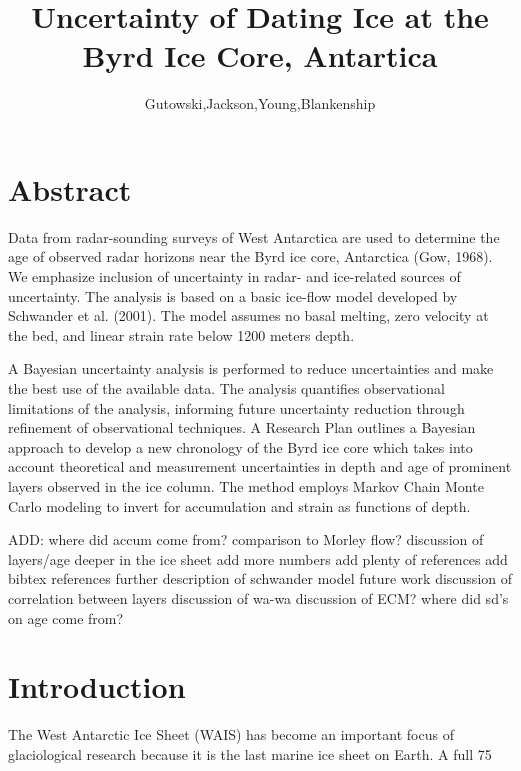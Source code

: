 \documentclass[draft,jgrga]{agutex}
\begin{document}
\title{Uncertainty of Dating Ice at the Byrd Ice Core, Antartica}
\author{Gutowski,Jackson,Young,Blankenship}

\section{Abstract}
Data from radar-sounding surveys of West Antarctica are used to determine the age of observed radar horizons near the Byrd ice core, Antarctica (Gow, 1968). We emphasize inclusion of uncertainty in radar- and ice-related sources of uncertainty. The analysis is based on a basic ice-flow model developed by Schwander et al. (2001). The model assumes no basal melting, zero velocity at the bed, and linear strain rate below 1200 meters depth.

A Bayesian uncertainty analysis is performed to reduce uncertainties and make the best use of the available data. The analysis quantifies observational limitations of the analysis, informing future uncertainty reduction through refinement of observational techniques. A Research Plan outlines a Bayesian approach to develop a new chronology of the Byrd ice core which takes into account theoretical and measurement uncertainties in depth and age of prominent layers observed in the ice column. The method employs Markov Chain Monte Carlo modeling to invert for accumulation and strain as functions of depth. 

ADD: where did accum come from?
	comparison to Morley flow?
	discussion of layers/age deeper in the ice sheet
	add more numbers
	add plenty of references
	add bibtex references
	further description of schwander model
	future work
	discussion of correlation between layers
	discussion of wa-wa
	discussion of ECM?
	where did sd's on age come from?


\section{Introduction}

The West Antarctic Ice Sheet (WAIS) has become an important focus of glaciological research because it is the last marine ice sheet on Earth. A full 75%
\end{document}
